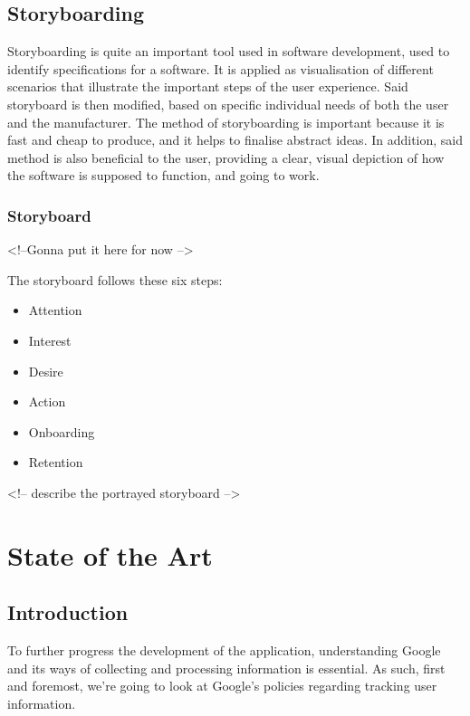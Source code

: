 \documentclass[12p]{article}
\begin{document}
    		\subsection{Storyboarding}
    		Storyboarding is quite an important tool used in software development, used to identify specifications for a software. It is applied as visualisation of different scenarios that illustrate the important steps of the user experience. Said storyboard is then modified, based on specific individual needs of both the user and the manufacturer. The method of storyboarding is important because it is fast and cheap to produce, and it helps to finalise abstract ideas. In addition, said method is also beneficial to the user, providing a clear, visual depiction of how the software is supposed to function, and going to work.
    		
    		\subsubsection{Storyboard} <!--Gonna put it here for now -->
    		
    		The storyboard follows these six steps:
    		\begin{itemize}
    		    \item Attention
    		    \item Interest
    		    \item Desire
    		    \item Action
    		    \item Onboarding
    		    \item Retention
    		\end{itemize}
    		
    		<!-- describe the portrayed storyboard -->
    		
    		
		\newpage
		\section{State of the Art} \label{sec:StateOfTheArt}
    		\subsection{Introduction}
		
		To further progress the development of the application, understanding Google and its ways of collecting and processing information is essential. As such, first and foremost, we’re going to look at Google’s policies regarding tracking user information.
        
\end{document}
